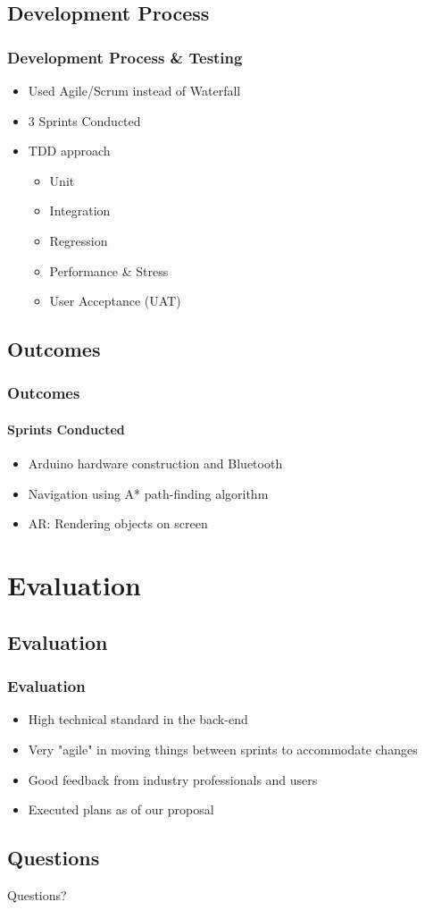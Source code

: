 \documentclass[compress]{beamer}
\begin{document}
	\subsection{Development Process}
	\begin{frame}
	    \frametitle{Development Process \& Testing}
		\begin{itemize}
			\item Used Agile/Scrum instead of Waterfall
			\item 3 Sprints Conducted
			\item TDD approach
			\begin{itemize}
				\item Unit
				\item Integration
				\item Regression
				\item Performance \& Stress
				\item User Acceptance (UAT)
			\end{itemize}
		\end{itemize}
	\end{frame}

	\subsection{Outcomes}
	\begin{frame}
		\frametitle{Outcomes}

		\framesubtitle{Sprints Conducted}
		\begin{itemize}
			\item Arduino hardware construction and Bluetooth
			\item Navigation using A* path-finding algorithm
			\item AR: Rendering objects on screen
		\end{itemize}
	\end{frame}

	\section{Evaluation}
	\subsection{Evaluation}
		\begin{frame}
			\frametitle{Evaluation}
			\begin{itemize}
				\item High technical standard in the back-end
				\item Very "agile" in moving things between sprints to accommodate changes
				\item Good feedback from industry professionals and users
				\item Executed plans as of our proposal
			\end{itemize}
		\end{frame}

	\subsection{Questions}
	\begin{frame}
		\begin{center}
			\Huge Questions?
		\end{center}
	\end{frame}
\end{document}
